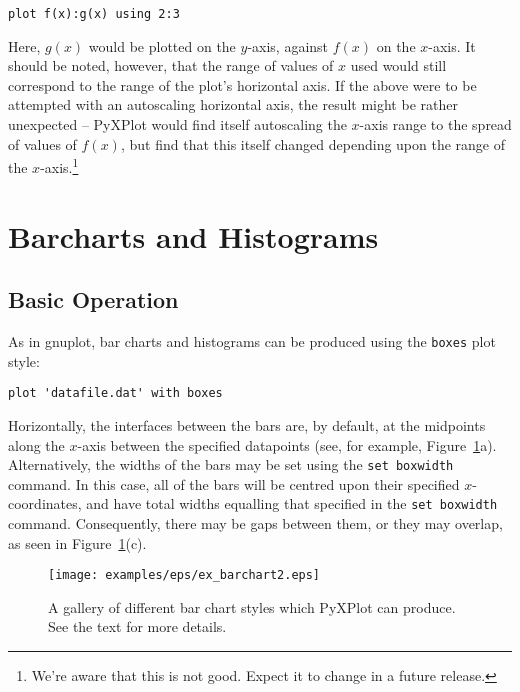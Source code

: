 \begin{verbatim}
plot f(x):g(x) using 2:3
\end{verbatim}

Here, $g(x)$ would be plotted on the $y$-axis, against $f(x)$ on the $x$-axis.
It should be noted, however, that the range of values of $x$ used would still
correspond to the range of the plot's horizontal axis. If the above were to be
attempted with an autoscaling horizontal axis, the result might be rather
unexpected -- PyXPlot would find itself autoscaling the $x$-axis range to the
spread of values of $f(x)$, but find that this itself changed depending upon
the range of the $x$-axis.\footnote{We're aware that this is not good. Expect
it to change in a future release.}

\section{Barcharts and Histograms}
\label{barcharts}

\subsection{Basic Operation}

As in gnuplot, bar charts and histograms can be produced using the
{\tt boxes} plot style:

\begin{verbatim} 
plot 'datafile.dat' with boxes
\end{verbatim}

\noindent Horizontally, the interfaces between the bars are, by default, at the
midpoints along the $x$-axis between the specified datapoints (see, for
example, Figure~\ref{fig:ex_barchart2}a).  Alternatively, the widths of the
bars may be set using the {\tt set boxwidth} command. In this case, all of
the bars will be centred upon their specified $x$-coordinates, and have total
widths equalling that specified in the {\tt set boxwidth} command.  Consequently, there may be
gaps between them, or they may overlap, as seen in
Figure~\ref{fig:ex_barchart2}(c).

\begin{figure}
\begin{center}
\texttt{[image: examples/eps/ex\_barchart2.eps]}
\end{center}
\caption{A gallery of different bar chart styles which PyXPlot can produce. See the text for more details.}
\label{fig:ex_barchart2}
\end{figure}

